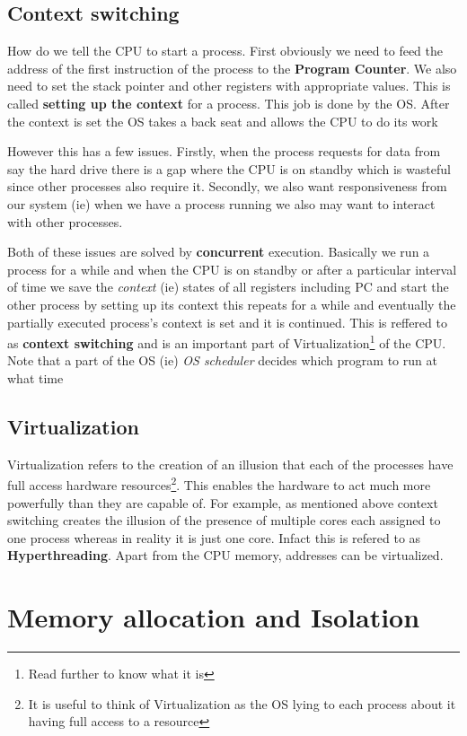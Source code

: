 \documentclass[12pt]{article}
\begin{document}
\subsection{Context switching}
\label{section:context}
How do we tell the CPU to start a process. First obviously we need to feed the address of the first instruction of the process to the \textbf{Program Counter}. We also need to set 
the stack pointer and other registers with appropriate values. This is called \textbf{setting up the context} for a process. This job is done by the OS. After the context is set the OS takes a back seat and allows the CPU to do its work


\noindent However this has a few issues. Firstly, when the process requests for data from say the hard drive there is a gap where the CPU 
is on standby which is wasteful since other processes also require it. Secondly, we also want responsiveness from our system (ie) when
we have a process running we also may want to interact with other processes. 


Both of these issues are solved by \textbf{concurrent} execution. Basically we run a process for a while and when the CPU is on standby or after a 
particular interval of time we save the \textit{context} (ie) states of all registers including PC and start the other process by setting up its context this repeats
for a while and eventually the partially executed process's context is set and it is continued.
This is reffered to as \textbf{context switching} and is an important part of Virtualization\footnote{Read further to know what it is} of the CPU.
Note that a part of the OS (ie) \textit{OS scheduler} decides which program to run at what time

\subsection{Virtualization}
Virtualization refers to the creation of an illusion that each of the processes have full access hardware resources\footnote{It is useful to think of Virtualization as the OS lying to each process about it having full access to a resource}. This
enables the hardware to act much more powerfully than they are capable of. For example, as mentioned above context switching creates the illusion
of the presence of multiple cores each assigned to one process whereas in reality it is just one core.
Infact this is refered to as \textbf{Hyperthreading}. Apart from the CPU memory, addresses can be virtualized.

\section{Memory allocation and Isolation}
\label{section:mem_alloc}
\end{document}
